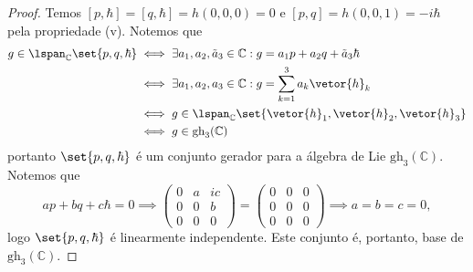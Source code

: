 \begin{proof}
    Temos \([p,\hbar] =  [q, \hbar] = h(0,0,0) = 0\) e \([p, q] = h(0,0,1) = -i \hbar\) pela propriedade (v). Notemos que
    \begin{align*}
        g \in \lspan_{\mathbb{C}}\set{p,q,\hbar} &\iff \exists a_1, a_2, \tilde{a}_3 \in \mathbb{C} : g = a_1 p + a_2 q + \tilde{a}_3 \hbar\\
                                                 &\iff \exists a_1,a_2,a_3 \in \mathbb{C}: g = \sum_{k=1}^3 a_k\vetor{h}_k\\
                                                 &\iff g \in \lspan_{\mathbb{C}}\set{\vetor{h}_1, \vetor{h}_2, \vetor{h}_3}\\
                                                 &\iff g \in \mathrm{gh}_3(\mathbb{C})
    \end{align*}
    portanto \(\set{p,q,\hbar}\) é um conjunto gerador para a álgebra de Lie \(\mathrm{gh}_3(\mathbb{C})\). Notemos que
    \begin{equation*}
        a p + b q + c \hbar = 0 \implies \begin{pmatrix}
            0 & a & ic\\
            0 & 0 & b\\
            0 & 0 & 0
        \end{pmatrix} = \begin{pmatrix}
            0 & 0 & 0\\
            0 & 0 & 0\\
            0 & 0 & 0
        \end{pmatrix} \implies a = b = c = 0,
    \end{equation*}
    logo \(\set{p,q,\hbar}\) é linearmente independente. Este conjunto é, portanto, base de \(\mathrm{gh}_3(\mathbb{C})\).
\end{proof}

